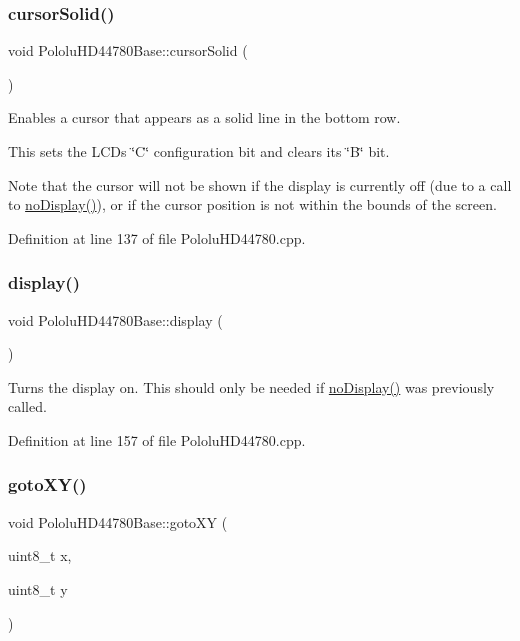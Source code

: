 \subsubsection{\texorpdfstring{cursor\+Solid()}{cursorSolid()}}
{\footnotesize\ttfamily void Pololu\+H\+D44780\+Base\+::cursor\+Solid (\begin{DoxyParamCaption}{ }\end{DoxyParamCaption})}

Enables a cursor that appears as a solid line in the bottom row.

This sets the L\+CD\textquotesingle{}s \char`\"{}\+C\char`\"{} configuration bit and clears its \char`\"{}\+B\char`\"{} bit.

Note that the cursor will not be shown if the display is currently off (due to a call to \hyperlink{class_pololu_h_d44780_base_abc2d4e126017565c2a0cf2aac67870a0}{no\+Display()}), or if the cursor position is not within the bounds of the screen. 

Definition at line 137 of file Pololu\+H\+D44780.\+cpp.

\mbox{\label{class_pololu_h_d44780_base_af5dd1e137bfe9310a418924b7483fcdf}} 
\subsubsection{\texorpdfstring{display()}{display()}}
{\footnotesize\ttfamily void Pololu\+H\+D44780\+Base\+::display (\begin{DoxyParamCaption}{ }\end{DoxyParamCaption})}

Turns the display on. This should only be needed if \hyperlink{class_pololu_h_d44780_base_abc2d4e126017565c2a0cf2aac67870a0}{no\+Display()} was previously called. 

Definition at line 157 of file Pololu\+H\+D44780.\+cpp.

\mbox{\label{class_pololu_h_d44780_base_a4886df8c888669cf71675072689ace9b}} 
\subsubsection{\texorpdfstring{goto\+X\+Y()}{gotoXY()}}
{\footnotesize\ttfamily void Pololu\+H\+D44780\+Base\+::goto\+XY (\begin{DoxyParamCaption}\item[{uint8\+\_\+t}]{x,  }\item[{uint8\+\_\+t}]{y }\end{DoxyParamCaption})}

